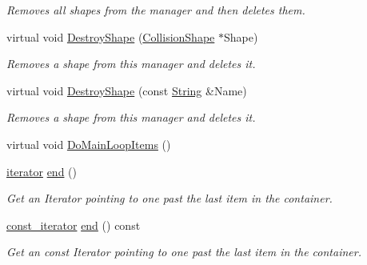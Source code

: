 \begin{DoxyCompactItemize}
\begin{DoxyCompactList}\small\item\em Removes all shapes from the manager and then deletes them. \item\end{DoxyCompactList}\item 
virtual void \hyperlink{classMezzanine_1_1CollisionShapeManager_a5711e761a06781792d021537b1089770}{DestroyShape} (\hyperlink{classMezzanine_1_1CollisionShape}{CollisionShape} $\ast$Shape)
\begin{DoxyCompactList}\small\item\em Removes a shape from this manager and deletes it. \item\end{DoxyCompactList}\item 
virtual void \hyperlink{classMezzanine_1_1CollisionShapeManager_a1abaa37c1ce061421cb22999b7b67e84}{DestroyShape} (const \hyperlink{namespaceMezzanine_acf9fcc130e6ebf08e3d8491aebcf1c86}{String} \&Name)
\begin{DoxyCompactList}\small\item\em Removes a shape from this manager and deletes it. \item\end{DoxyCompactList}\item 
virtual void \hyperlink{classMezzanine_1_1CollisionShapeManager_ac055cf940fd8fce522625de6b977dd2a}{DoMainLoopItems} ()
\item 
\hyperlink{classMezzanine_1_1CollisionShapeManager_abec03ca004aae3ce0dc478e34e5d1252}{iterator} \hyperlink{classMezzanine_1_1CollisionShapeManager_adff97f4013578c91612a14df59402d98}{end} ()
\begin{DoxyCompactList}\small\item\em Get an Iterator pointing to one past the last item in the container. \item\end{DoxyCompactList}\item 
\hyperlink{classMezzanine_1_1CollisionShapeManager_a44318f2b04d35ecc76d5c58ea574f0f0}{const\_\-iterator} \hyperlink{classMezzanine_1_1CollisionShapeManager_a1ddb9f421eb024dd3dc67cf8914eef18}{end} () const 
\begin{DoxyCompactList}\small\item\em Get an const Iterator pointing to one past the last item in the container. \item\end{DoxyCompactList}\item 

\end{DoxyCompactItemize}
